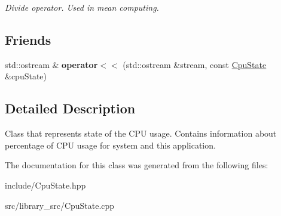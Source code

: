 \begin{DoxyCompactItemize}
\begin{DoxyCompactList}\small\item\em Divide operator. Used in mean computing. \end{DoxyCompactList}\end{DoxyCompactItemize}
\subsection*{Friends}
\begin{DoxyCompactItemize}
\item 
std\+::ostream \& {\bfseries operator$<$$<$} (std\+::ostream \&stream, const \hyperlink{classCpuState}{Cpu\+State} \&cpu\+State)\hypertarget{classCpuState_afe947a5dc264b0bcbcd1fff64a9159ca}{}\label{classCpuState_afe947a5dc264b0bcbcd1fff64a9159ca}

\end{DoxyCompactItemize}


\subsection{Detailed Description}
Class that represents state of the C\+PU usage. Contains information about percentage of C\+PU usage for system and this application. 

The documentation for this class was generated from the following files\+:\begin{DoxyCompactItemize}
\item 
include/Cpu\+State.\+hpp\item 
src/library\+\_\+src/Cpu\+State.\+cpp\end{DoxyCompactItemize}
